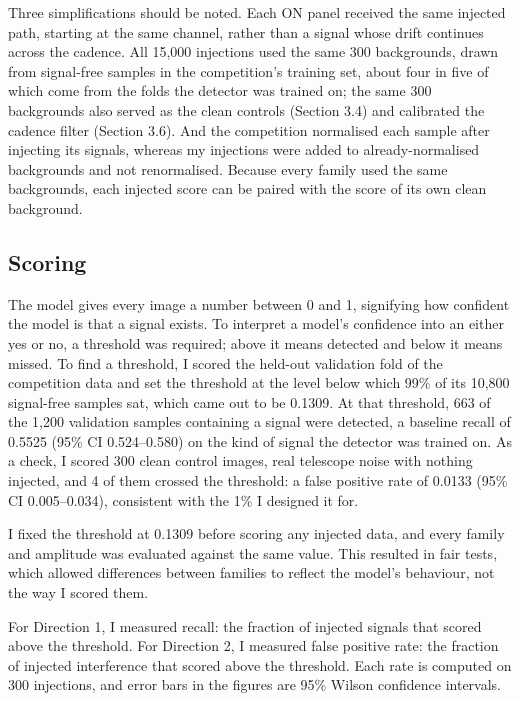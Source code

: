 \documentclass[11pt]{article}
\begin{document}
Three simplifications should be noted. Each ON panel received the same injected path, starting at the same channel, rather than a signal whose drift continues across the cadence. All 15,000 injections used the same 300 backgrounds, drawn from signal-free samples in the competition's training set, about four in five of which come from the folds the detector was trained on; the same 300 backgrounds also served as the clean controls (Section 3.4) and calibrated the cadence filter (Section 3.6). And the competition normalised each sample after injecting its signals, whereas my injections were added to already-normalised backgrounds and not renormalised. Because every family used the same backgrounds, each injected score can be paired with the score of its own clean background.

\subsection{Scoring}
The model gives every image a number between 0 and 1, signifying how confident the model is that a signal exists. To interpret a model's confidence into an either yes or no, a threshold was required; above it means detected and below it means missed. To find a threshold, I scored the held-out validation fold of the competition data and set the threshold at the level below which 99\% of its 10,800 signal-free samples sat, which came out to be 0.1309. At that threshold, 663 of the 1,200 validation samples containing a signal were detected, a baseline recall of 0.5525 (95\% CI 0.524--0.580) on the kind of signal the detector was trained on. As a check, I scored 300 clean control images, real telescope noise with nothing injected, and 4 of them crossed the threshold: a false positive rate of 0.0133 (95\% CI 0.005--0.034), consistent with the 1\% I designed it for.

I fixed the threshold at 0.1309 before scoring any injected data, and every family and amplitude was evaluated against the same value. This resulted in fair tests, which allowed differences between families to reflect the model's behaviour, not the way I scored them.

For Direction 1, I measured recall: the fraction of injected signals that scored above the threshold. For Direction 2, I measured false positive rate: the fraction of injected interference that scored above the threshold. Each rate is computed on 300 injections, and error bars in the figures are 95\% Wilson confidence intervals.
\end{document}
